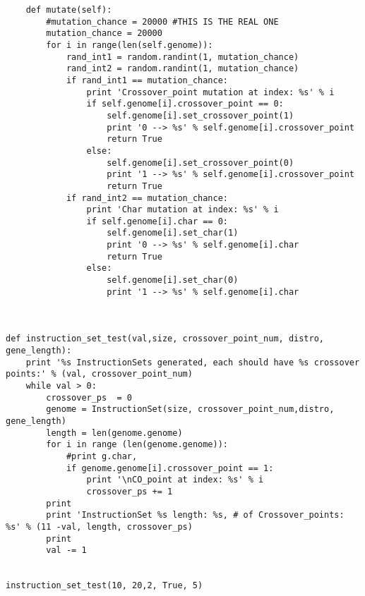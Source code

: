\documentclass[a4paper]{article}
\begin{document}
\begin{verbatim}
    def mutate(self):
        #mutation_chance = 20000 #THIS IS THE REAL ONE
        mutation_chance = 20000
        for i in range(len(self.genome)):
            rand_int1 = random.randint(1, mutation_chance)
            rand_int2 = random.randint(1, mutation_chance)
            if rand_int1 == mutation_chance:
                print 'Crossover_point mutation at index: %s' % i
                if self.genome[i].crossover_point == 0:
                    self.genome[i].set_crossover_point(1)
                    print '0 --> %s' % self.genome[i].crossover_point
                    return True
                else:
                    self.genome[i].set_crossover_point(0)
                    print '1 --> %s' % self.genome[i].crossover_point
                    return True
            if rand_int2 == mutation_chance:
                print 'Char mutation at index: %s' % i
                if self.genome[i].char == 0:
                    self.genome[i].set_char(1)
                    print '0 --> %s' % self.genome[i].char
                    return True
                else:
                    self.genome[i].set_char(0) 
                    print '1 --> %s' % self.genome[i].char



def instruction_set_test(val,size, crossover_point_num, distro, gene_length):
    print '%s InstructionSets generated, each should have %s crossover points:' % (val, crossover_point_num)
    while val > 0:
        crossover_ps  = 0
        genome = InstructionSet(size, crossover_point_num,distro, gene_length)
        length = len(genome.genome)
        for i in range (len(genome.genome)):
            #print g.char, 
            if genome.genome[i].crossover_point == 1:
                print '\nCO_point at index: %s' % i
                crossover_ps += 1
        print
        print 'InstructionSet %s length: %s, # of Crossover_points: %s' % (11 -val, length, crossover_ps)
        print
        val -= 1


instruction_set_test(10, 20,2, True, 5)
\end{verbatim}
\end{document}

